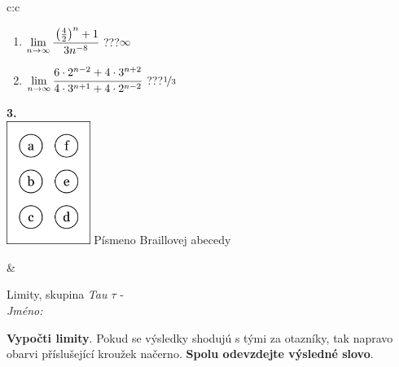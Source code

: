 \documentclass[10pt]{report}
\begin{document}
\begin{tabular}{c:c}
\begin{minipage}[c][104.5mm][t]{0.5\linewidth}
\begin{center}
\begin{minipage}{0.79\linewidth}
\begin{center}
\begin{varwidth}{\linewidth}
\begin{enumerate}
\item $\lim\limits_{n\to\infty}\cfrac{\left(\frac{4}{2}\right)^n +1}{3n^{-8}}$\quad \dotfill\; ???\;\dotfill \quad $\infty$
\item $\lim\limits_{n\to\infty}\cfrac{6\cdot 2^{n-2}+4\cdot 3^{n+2}}{4\cdot 3^{n+1}+4\cdot 2^{n-2}}$\quad \dotfill\; ???\;\dotfill \quad $\nicefrac{1}{3}$
\end{enumerate}
\end{varwidth}
\end{center}
\end{minipage}
\begin{minipage}{0.20\linewidth}
\begin{center}
{\Huge\bfseries 3.} \\[2mm]
\includegraphics[height=40mm]{../images/braille.png}
{\small Písmeno Braillovej abecedy}
\end{center}
\end{minipage}
\end{center}
\end{minipage}
&
\begin{minipage}[c][104.5mm][t]{0.5\linewidth}
\begin{center}
\vspace{7mm}
{\huge Limity, skupina \textit{Tau $\tau$} -}\\[5mm]
\textit{Jméno:}\phantom{xxxxxxxxxxxxxxxxxxxxxxxxxxxxxxxxxxxxxxxxxxxxxxxxxxxxxxxxxxxxxxxxx}\\[5mm]
\begin{minipage}{0.95\linewidth}
\begin{center}
\textbf{Vypočti limity}. Pokud se výsledky shodujú s tými za otazníky, tak napravo\\obarvi příslušející kroužek načerno. \textbf{Spolu odevzdejte výsledné slovo}.
\end{center}
\end{minipage}
\\[1mm]
\begin{minipage}{0.79\linewidth}
\begin{center}
\begin{varwidth}{\linewidth}

\end{varwidth}
\end{center}
\end{minipage}
\end{center}
\end{minipage}
\end{tabular}
\end{document}
